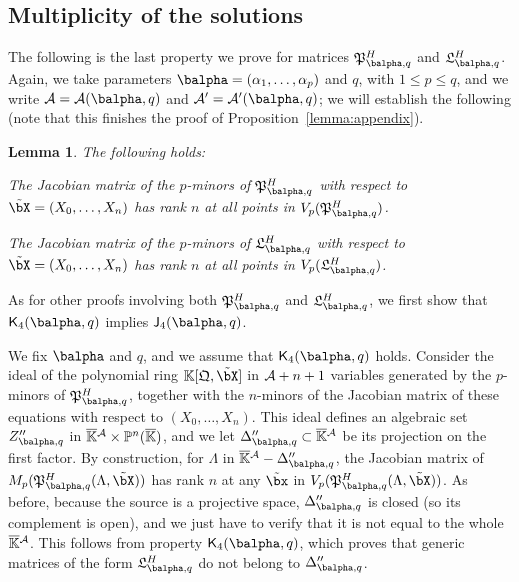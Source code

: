 \documentclass[12pt]{article}
\newtheorem{lemma}[definition]{Lemma}
\begin{document}
\subsection{Multiplicity of the solutions} 
The following is the last property we prove for matrices 
$\mathfrak{P}^H_{\balpha,q}$ and $\mathfrak{L}^H_{\balpha,q}$.
Again, we take parameters $\balpha=(\alpha_1,\dots,\alpha_p)$ and $q$,
with $1 \le p \le q$, and we write ${\cal A}={\cal A}(\balpha,q)$ and
${\cal A}'={\cal A}'(\balpha,q)$; we will establish the following
(note that this finishes the proof of Proposition~\ref{lemma:appendix}).
\begin{lemma}The following holds:
\begin{description}[leftmargin=*]
\item[$\assI_4(\balpha,q).$] The Jacobian matrix of
  the $p$-minors of $\mathfrak{P}^H_{\balpha,q}$ with respect to
  $\tilde\bX=(X_0,\dots,X_n)$ has rank $n$ at all points in
  $V_p(\mathfrak{P}^H_{\balpha,q})$.
\item[$\assJ_4(\balpha,q).$] The Jacobian matrix of
  the $p$-minors of $\mathfrak{L}^H_{\balpha,q}$ with respect to
  $\tilde\bX=(X_0,\dots,X_n)$ has rank $n$ at all points in
  $V_p(\mathfrak{L}^H_{\balpha,q})$.
\end{description}
\end{lemma}
As for other proofs involving both $\mathfrak{P}^H_{\balpha,q}$ and
$\mathfrak{L}^H_{\balpha,q}$, we first show that $\assJ_4(\balpha,q)$
implies $\assI_4(\balpha,q)$.

We fix $\balpha$ and $q$, and we assume that $\assJ_4(\balpha,q)$
holds. Consider the ideal of the polynomial ring
$\KK[\mathfrak{Q},\tilde\bX]$ in ${\cal A}+n+1$ variables generated by the
$p$-minors of $\mathfrak{P}^H_{\balpha,q}$, together with the
$n$-minors of the Jacobian matrix of these equations with respect to
$(X_0,\dots,X_n)$. This ideal defines an algebraic set
$Z''_{\balpha,q}$ in $\overline{\mathbb{K}}{}^{\cal A} \times \mathbb{P}^n(\overline{\mathbb{K}})$, and we let
$\Delta''_{\balpha,q} \subset \KKbar{}^{\cal A}$ be its projection on the
first factor. By construction, for $\Lambda$ in
$\KKbar{}^{\cal A}-\Delta''_{\balpha,q}$, the Jacobian matrix of
$M_p(\mathfrak{P}^H_{\balpha,q}(\Lambda,\tilde\bX))$ has rank $n$ at
any $\tilde\bx$ in
$V_p(\mathfrak{P}^H_{\balpha,q}(\Lambda,\tilde\bX))$. As before,
because the source is a projective space, $\Delta''_{\balpha,q}$ is closed
(so its complement is open), and we just have to verify that it is not
equal to the whole $\overline{\mathbb{K}}{}^{\cal A}$. This follows from property
$\assJ_4(\balpha,q)$, which proves that generic matrices of the form
$\mathfrak{L}^H_{\balpha,q}$ do not belong to $\Delta''_{\balpha,q}$.
\end{document}
